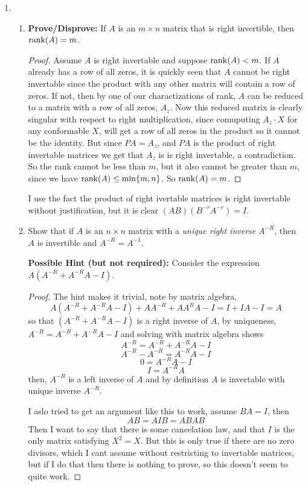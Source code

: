 \documentclass[11pt,table]{article}
\newcommand{\<}				{\langle}
\renewcommand{\>}      		{\rangle}
\def\rank{\mathop{\rm rank}}
\def\min{\mathop{\rm min}}
\begin{document}
\begin{enumerate}
\smallskip
\item 
\begin{enumerate}

	\item {\bf Prove/Disprove:} If $A$ is an $m \times n$ matrix that is right invertible, then $\rank(A)=m$. 
	\begin{proof}
		Assume $A$ is right invertable and suppose $\rank(A) < m$. If $A$ already has a row of all zeros, it is quickly seen 
		that $A$ cannot be right invertable since the product with any other matrix will contain a row of zeros. 
		If not, then by one of our charactizations of rank, $A$ can be reduced to a matrix with a row of all zeros, $A_z$.  Now this reduced matrix is clearly singular with respect to right multiplication, since 
		comuputing $A_z \cdot X$ for any conformable $X$, will get a row of all zeros in the product so it cannot be the identity. But since $PA = A_z$, and $PA$ is the product of right invertable matrices we get that $A_z$ is  is right invertable, a contradiction.
		So the rank cannot be less than $m$, but it also cannot be greater than $m$, since we have $\rank(A) \leq \min\{m, n\} $. So $\rank(A) = m$. 
	\end{proof}

	I  use the fact the product of right ivertable matrices is right invertable without justification, but it is clear $(AB)(B^{-r}A^{-r}) = I$. 
	
	\bigskip
	
	\item Show that if $A$ is an $n \times n$ matrix with a {\em unique right inverse} $A^{-R}$, then $A$ is invertible and $A^{-R}=A^{-1}$. 	
	
	
	\medskip
	
	{\bf Possible Hint (but not required):} Consider the expression $A(A^{-R}+A^{-R}A-I)$.


	\begin{proof}
		The hint makes it trivial, note by matrix algebra, 
		\[ A(A^{-R} + A^{-R}A - I) + AA^{-R} + AA^{R}A - I= I + IA - I = A\]
		so that $(A^{-R}+A^{-R}A-I)$ is a right inverse of $A$, by uniqueness, $A^{-R} = A^{-R}+A^{-R}A-I$ and solving with matrix algebra shows 
		\[A^{-R} = A^{-R}+A^{-R}A-I\]
		\[A^{-R} - A^{-R} = A^{-R}A-I\]
		\[0 = A^{-R}A - I\]
		\[I = A^{-R}A\]
		then, $A^{-R}$ is a left inverse of $A$ and by definition $A$ is invertable with unique inverse $A^{-R}$. 


		I aslo tried to get an argument like this to work, 
		assume $BA = I$, then 
		\[AB = AIB = ABAB\]
		Then I want to say that there is some cancelation law, and that $I$ is the only matrix satisfying $X^2 = X$. But this is only true if there are no zero divisors, which I cant assume without restricting to invertable matrices, but if 
		I do that then there is nothing to prove, so this doesn't seem to quite work. 
	\end{proof}
	

\end{enumerate}
\end{enumerate}
\end{document}
